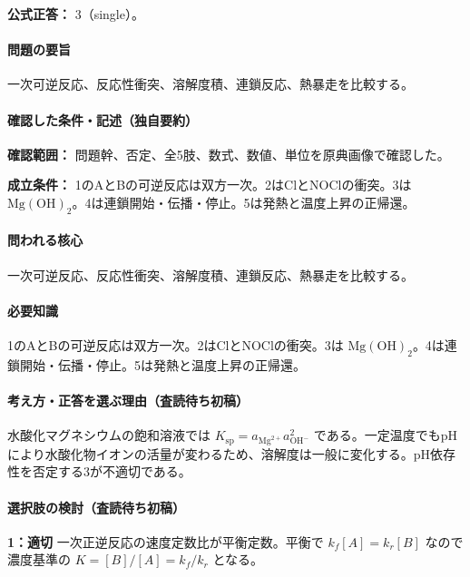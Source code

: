 \textbf{公式正答：} 3（single）。

\paragraph{問題の要旨} 一次可逆反応、反応性衝突、溶解度積、連鎖反応、熱暴走を比較する。

\paragraph{確認した条件・記述（独自要約）}\mbox{}\par

\noindent\textbf{確認範囲：} 問題幹、否定、全5肢、数式、数値、単位を原典画像で確認した。\par

\noindent\textbf{成立条件：} 1のAとBの可逆反応は双方一次。2はClとNOClの衝突。3は \(\mathrm{Mg(OH)_2}\)。4は連鎖開始・伝播・停止。5は発熱と温度上昇の正帰還。\par

\paragraph{問われる核心} 一次可逆反応、反応性衝突、溶解度積、連鎖反応、熱暴走を比較する。

\paragraph{必要知識} 1のAとBの可逆反応は双方一次。2はClとNOClの衝突。3は \(\mathrm{Mg(OH)_2}\)。4は連鎖開始・伝播・停止。5は発熱と温度上昇の正帰還。

\paragraph{考え方・正答を選ぶ理由（査読待ち初稿）} 水酸化マグネシウムの飽和溶液では \(K_{\mathrm{sp}}=a_{\mathrm{Mg^{2+}}}a_{\mathrm{OH^-}}^2\) である。一定温度でもpHにより水酸化物イオンの活量が変わるため、溶解度は一般に変化する。pH依存性を否定する3が不適切である。

\paragraph{選択肢の検討（査読待ち初稿）}\mbox{}\par

\noindent\textbf{1：適切} 一次正逆反応の速度定数比が平衡定数。平衡で \(k_f[A]=k_r[B]\) なので濃度基準の \(K=[B]/[A]=k_f/k_r\) となる。\par

